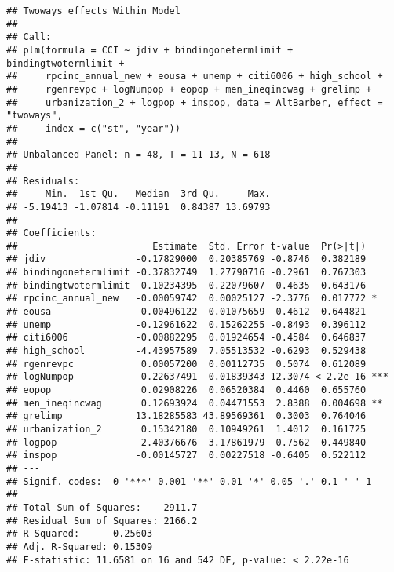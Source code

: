 \documentclass[]{article}
\begin{document}
\begin{verbatim}
## Twoways effects Within Model
## 
## Call:
## plm(formula = CCI ~ jdiv + bindingonetermlimit + bindingtwotermlimit + 
##     rpcinc_annual_new + eousa + unemp + citi6006 + high_school + 
##     rgenrevpc + logNumpop + eopop + men_ineqincwag + grelimp + 
##     urbanization_2 + logpop + inspop, data = AltBarber, effect = "twoways", 
##     index = c("st", "year"))
## 
## Unbalanced Panel: n = 48, T = 11-13, N = 618
## 
## Residuals:
##     Min.  1st Qu.   Median  3rd Qu.     Max. 
## -5.19413 -1.07814 -0.11191  0.84387 13.69793 
## 
## Coefficients:
##                        Estimate  Std. Error t-value  Pr(>|t|)    
## jdiv                -0.17829000  0.20385769 -0.8746  0.382189    
## bindingonetermlimit -0.37832749  1.27790716 -0.2961  0.767303    
## bindingtwotermlimit -0.10234395  0.22079607 -0.4635  0.643176    
## rpcinc_annual_new   -0.00059742  0.00025127 -2.3776  0.017772 *  
## eousa                0.00496122  0.01075659  0.4612  0.644821    
## unemp               -0.12961622  0.15262255 -0.8493  0.396112    
## citi6006            -0.00882295  0.01924654 -0.4584  0.646837    
## high_school         -4.43957589  7.05513532 -0.6293  0.529438    
## rgenrevpc            0.00057200  0.00112735  0.5074  0.612089    
## logNumpop            0.22637491  0.01839343 12.3074 < 2.2e-16 ***
## eopop                0.02908226  0.06520384  0.4460  0.655760    
## men_ineqincwag       0.12693924  0.04471553  2.8388  0.004698 ** 
## grelimp             13.18285583 43.89569361  0.3003  0.764046    
## urbanization_2       0.15342180  0.10949261  1.4012  0.161725    
## logpop              -2.40376676  3.17861979 -0.7562  0.449840    
## inspop              -0.00145727  0.00227518 -0.6405  0.522112    
## ---
## Signif. codes:  0 '***' 0.001 '**' 0.01 '*' 0.05 '.' 0.1 ' ' 1
## 
## Total Sum of Squares:    2911.7
## Residual Sum of Squares: 2166.2
## R-Squared:      0.25603
## Adj. R-Squared: 0.15309
## F-statistic: 11.6581 on 16 and 542 DF, p-value: < 2.22e-16
\end{verbatim}
\end{document}
